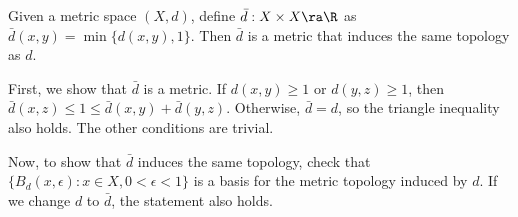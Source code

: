  Given a metric space \((X, d)\), define \(\bar{d}: X\times X \ra \R\) as \(\bar{d}(x, y) = \min\{d(x, y), 1\}\). Then \(\bar{d}\) is a metric that induces the same topology as \(d\).

\pf First, we show that \(\bar{d}\) is a metric. If \(d(x, y) \geq 1\) or \(d(y, z) \geq 1\), then \(\bar{d}(x, z) \leq 1 \leq \bar{d}(x, y) + \bar{d}(y, z)\). Otherwise, \(\bar{d} = d\), so the triangle inequality also holds. The other conditions are trivial.

Now, to show that \(\bar{d}\) induces the same topology, check that \(\{B_d(x, \epsilon) : x \in X, 0 < \epsilon < 1\}\) is a basis for the metric topology induced by \(d\). If we change \(d\) to \(\bar{d}\), the statement also holds.

\pagebreak
